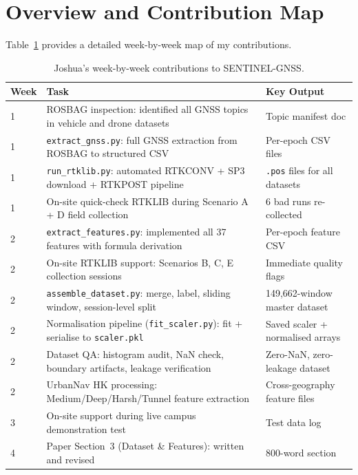 \documentclass[12pt,a4paper]{article}
\newcommand{\code}[1]{\texttt{#1}}
\begin{document}
\tableofcontents
\newpage

\section{Overview and Contribution Map}

Table~\ref{tab:contrib} provides a detailed week-by-week map of my contributions.

\begin{table}[H]
  \centering
  \caption{Joshua's week-by-week contributions to SENTINEL-GNSS.}
  \label{tab:contrib}
  \begin{tabularx}{\textwidth}{lXl}
    \toprule
    \textbf{Week} & \textbf{Task} & \textbf{Key Output} \\
    \midrule
    1 & ROSBAG inspection: identified all GNSS topics in vehicle and drone datasets &
        Topic manifest doc \\
    1 & \code{extract\_gnss.py}: full GNSS extraction from ROSBAG to structured CSV &
        Per-epoch CSV files \\
    1 & \code{run\_rtklib.py}: automated RTKCONV + SP3 download + RTKPOST pipeline &
        \code{.pos} files for all datasets \\
    1 & On-site quick-check RTKLIB during Scenario A + D field collection &
        6 bad runs re-collected \\
    2 & \code{extract\_features.py}: implemented all 37 features with formula derivation &
        Per-epoch feature CSV \\
    2 & On-site RTKLIB support: Scenarios B, C, E collection sessions &
        Immediate quality flags \\
    2 & \code{assemble\_dataset.py}: merge, label, sliding window, session-level split &
        149,662-window master dataset \\
    2 & Normalisation pipeline (\code{fit\_scaler.py}): fit + serialise to \code{scaler.pkl} &
        Saved scaler + normalised arrays \\
    2 & Dataset QA: histogram audit, NaN check, boundary artifacts, leakage verification &
        Zero-NaN, zero-leakage dataset \\
    2 & UrbanNav HK processing: Medium/Deep/Harsh/Tunnel feature extraction &
        Cross-geography feature files \\
    3 & On-site support during live campus demonstration test &
        Test data log \\
    4 & Paper Section~3 (Dataset \& Features): written and revised & 800-word section \\
    \bottomrule
  \end{tabularx}
\end{table}
\end{document}
